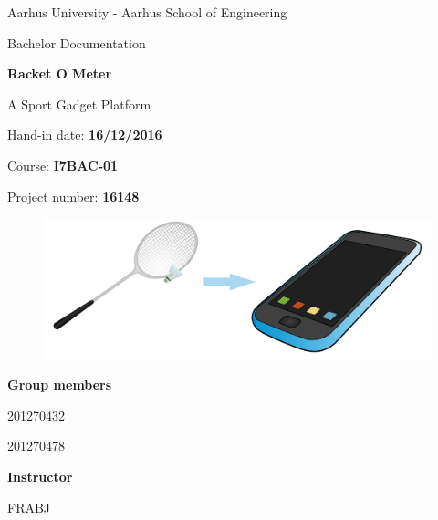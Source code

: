 \begin{titlingpage}

\centering 

Aarhus University - Aarhus School of Engineering

\vspace{0.6cm}

{\huge Bachelor Documentation}

\vspace{1cm}

{\Huge \textbf{Racket O Meter}}

{\LARGE A Sport Gadget Platform}
\vspace{0.6cm}

Hand-in date: \textbf{16/12/2016}

Course: \textbf{I7BAC-01}

Project number: \textbf{16148}
\vspace{1.8cm}

\begin{figure}[H] \centering
        \includegraphics[width=1\textwidth]{graphics/FrontpPic_v3}
    \end{figure}

\vspace{1.2cm}

\textbf{Group members}

\signature{Bjørn Sørensen}{201270432}
\signature{Jesper Christensen}{201270478}

\vspace{0.5cm}

\textbf{Instructor}
\signature{Frank Bodholdt Jakobsen}{FRABJ}

\end{titlingpage}

